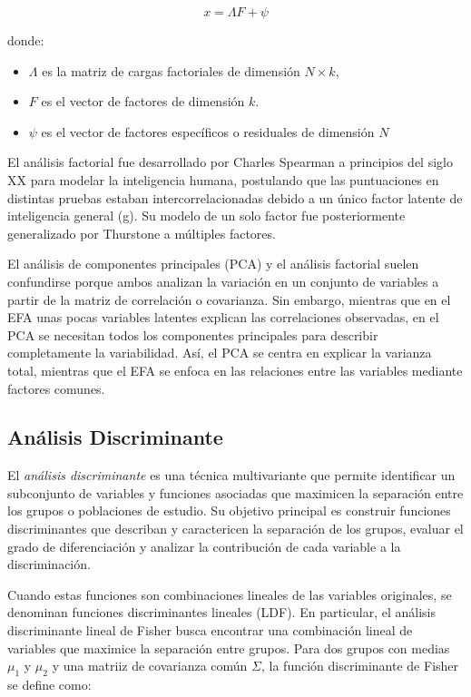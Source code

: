 \[
x=\Lambda F + \psi
\]

donde:

\begin{itemize}
    \item $\Lambda$ es la matriz de cargas factoriales de dimensión $N \times k$,
    \item $F$ es el vector de factores de dimensión $k$.
    \item $\psi$ es el vector de factores específicos o residuales de dimensión $N$
\end{itemize}

El análisis factorial fue desarrollado por Charles Spearman a principios del siglo XX para modelar la inteligencia humana, 
postulando que las puntuaciones en distintas pruebas estaban intercorrelacionadas debido a un único factor latente de inteligencia 
general (g). Su modelo de un solo factor fue posteriormente generalizado por Thurstone a múltiples factores. \newline

El análisis de componentes principales (PCA)  y el análisis factorial suelen confundirse porque ambos analizan 
la variación en un conjunto de variables a partir de la matriz de correlación o covarianza. Sin embargo, mientras que en el EFA unas 
pocas variables latentes explican las correlaciones observadas, en el PCA se necesitan todos los componentes principales para describir 
completamente la variabilidad. Así, el PCA se centra en explicar la varianza total, mientras que el EFA se enfoca en las relaciones 
entre las variables mediante factores comunes. 



\subsection{Análisis Discriminante}

El \textit{análisis discriminante} es una técnica multivariante que permite identificar un subconjunto de variables y funciones
asociadas que maximicen la separación entre los grupos o poblaciones de estudio. Su objetivo principal es construir funciones
discriminantes que describan y caractericen la separación de los grupos, evaluar el grado de diferenciación y analizar la contribución
de cada variable a la discriminación. \newline

Cuando estas funciones son combinaciones lineales de las variables originales, se denominan funciones discriminantes lineales (LDF). En
particular, el análisis discriminante lineal de Fisher busca encontrar una combinación lineal de variables que maximice la separación
entre grupos. Para dos grupos con medias $\mu_{1}$ y $\mu_{2}$ y una matriiz de covarianza común $\Sigma$, la función discriminante de Fisher
se define como:

